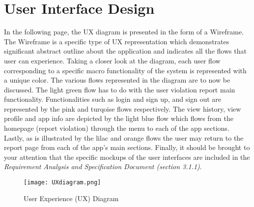 \section{User Interface Design}
In the following page, the UX diagram is presented in the form of a Wireframe. The Wireframe is a specific type of UX representation which demonstrates significant abstract outline about the application and indicates all the flows that user can experience.  Taking a closer look at the diagram, each user flow corresponding to a specific macro functionality of the system is represented with a unique color. The various flows represented in the diagram are to now be discussed. The light green flow has to do with the user violation report main functionality. Functionalities such as login and sign up, and sign out are represented by the pink and turqoise flows respectively. The view history, view profile and app info are depicted by the light blue flow which flows from the homepage (report violation) through the menu to each of the app sections. Lastly, as is illustrated by the lilac and orange flows the user may return to the report page from each of the app's main sections. Finally, it should be brought to your attention that the specific mockups of the user interfaces are included in the \emph{Requirement Analysis and Specification Document (section 3.1.1)}.

\begin{sidewaysfigure}
\begin{figure}[H]
\caption{User Experience (UX) Diagram}
\label{fig:Class}
\centering
\texttt{[image: UXdiagram.png]}
\end{figure}
\end{sidewaysfigure}

